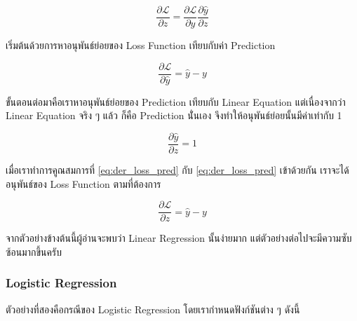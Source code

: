 \begin{equation}\label{eq:loss_chain_rule}
    \frac{\partial \mathcal{L}}{\partial z} = 
    \frac{\partial \mathcal{L}}{\partial \hat{y}} \frac{\partial \hat{y}}{\partial z}
\end{equation}

\noindent เริ่มต้นด้วยการหาอนุพันธ์ย่อยของ Loss Function เทียบกับค่า Prediction

\begin{equation}\label{eq:der_loss_pred}
    \frac{\partial \mathcal{L}}{\partial \hat{y}} = \hat{y} - y
\end{equation}

\noindent ขั้นตอนต่อมาคือเราหาอนุพันธ์ย่อยของ Prediction เทียบกับ Linear Equation แต่เนื่องจากว่า Linear Equation จริง ๆ แล้ว%
ก็คือ Prediction นั่่นเอง จึงทำให้อนุพันธ์ย่อยนั้นมีค่าเท่ากับ 1

\begin{equation}\label{eq:der_pred_lin_eq}
    \frac{\partial \hat{y}}{\partial z} = 1
\end{equation}

\noindent เมื่อเราทำการคูณสมการที่ \ref{eq:der_loss_pred} กับ \ref{eq:der_loss_pred} เข้าด้วยกัน เราจะได้อนุพันธ์ของ Loss 
Function ตามที่ต้องการ 

\begin{equation}\label{eq:der_loss_lin_eq}
    \frac{\partial \mathcal{L}}{\partial z} = \hat{y} - y
\end{equation}

\noindent จากตัวอย่างข้างต้นนี้ผู้อ่านจะพบว่า Linear Regression นั้นง่ายมาก แต่ตัวอย่างต่อไปจะมีความซับซ้อนมากขึ้นครับ

\subsubsection{Logistic Regression}

ตัวอย่างที่สองคือกรณีของ Logistic Regression โดยเรากำหนดฟังก์ชันต่าง ๆ ดังนี้


